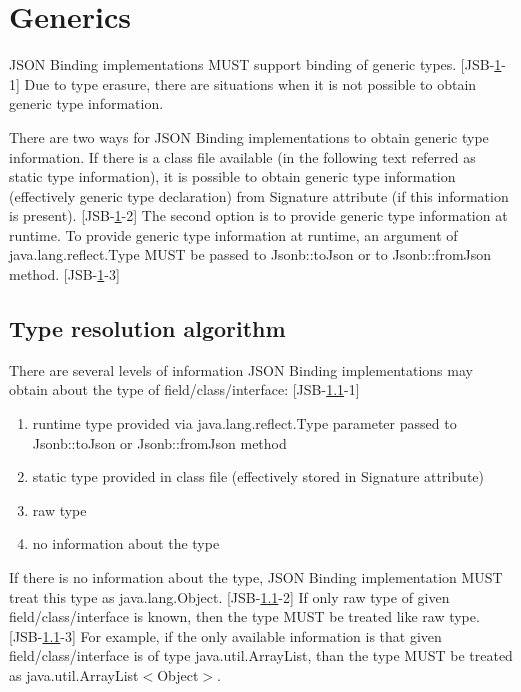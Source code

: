 \section{Generics}
\label{sec:generics}
JSON Binding implementations MUST support binding of generic types. [JSB-\ref{sec:generics}-1] Due to type erasure, there are situations when it is not possible to obtain generic type information.

There are two ways for JSON Binding implementations to obtain generic type information. If there is a class file available (in the following text referred as static type information), it is possible to obtain generic type information (effectively generic type declaration) from Signature attribute (if this information is present). [JSB-\ref{sec:generics}-2] The second option is to provide generic type information at runtime. To provide generic type information at runtime, an argument of java.lang.reflect.Type MUST be passed to Jsonb::toJson or to Jsonb::fromJson method. [JSB-\ref{sec:generics}-3]

\subsection{Type resolution algorithm}
\label{sec:type_resolution_algorithm}
There are several levels of information JSON Binding implementations may obtain about the type of field/class/interface: [JSB-\ref{sec:type_resolution_algorithm}-1]

\begin{enumerate}
	\item runtime type provided via java.lang.reflect.Type parameter passed to Jsonb::toJson or Jsonb::fromJson method
	\item static type provided in class file (effectively stored in Signature attribute)
	\item raw type
	\item no information about the type
\end{enumerate}

If there is no information about the type, JSON Binding implementation MUST treat this type as java.lang.Object. [JSB-\ref{sec:type_resolution_algorithm}-2]
If only raw type of given field/class/interface is known, then the type MUST be treated like raw type. [JSB-\ref{sec:type_resolution_algorithm}-3] For example, if the only available information is that given field/class/interface is of type java.util.ArrayList, than the type MUST be treated as java.util.ArrayList\(<\)Object\(>\).

